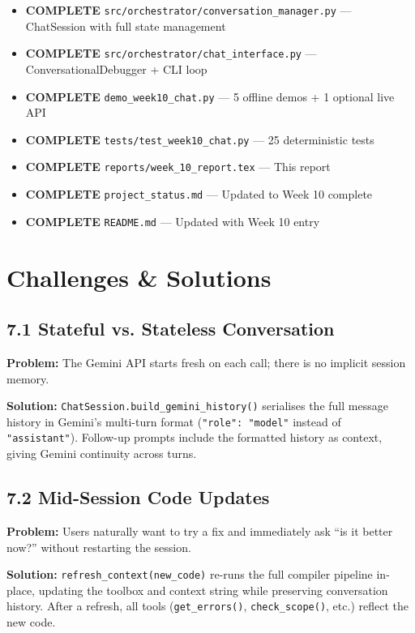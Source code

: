 \documentclass[a4paper,11pt]{article}
\newcommand{\statusgood}[1]{\colorbox{green!20}{\textbf{#1}}}
\begin{document}
\begin{itemize}[leftmargin=*]
    \item \statusgood{COMPLETE} \texttt{src/orchestrator/conversation\_manager.py} --- ChatSession with full state management
    \item \statusgood{COMPLETE} \texttt{src/orchestrator/chat\_interface.py} --- ConversationalDebugger + CLI loop
    \item \statusgood{COMPLETE} \texttt{demo\_week10\_chat.py} --- 5 offline demos + 1 optional live API
    \item \statusgood{COMPLETE} \texttt{tests/test\_week10\_chat.py} --- 25 deterministic tests
    \item \statusgood{COMPLETE} \texttt{reports/week\_10\_report.tex} --- This report
    \item \statusgood{COMPLETE} \texttt{project\_status.md} --- Updated to Week 10 complete
    \item \statusgood{COMPLETE} \texttt{README.md} --- Updated with Week 10 entry
\end{itemize}

\section{Challenges \& Solutions}

\subsection{7.1 Stateful vs. Stateless Conversation}
\textbf{Problem:} The Gemini API starts fresh on each call; there is no implicit session memory.

\textbf{Solution:} \texttt{ChatSession.build\_gemini\_history()} serialises the full message history in Gemini's multi-turn format (\texttt{"role": "model"} instead of \texttt{"assistant"}). Follow-up prompts include the formatted history as context, giving Gemini continuity across turns.

\subsection{7.2 Mid-Session Code Updates}
\textbf{Problem:} Users naturally want to try a fix and immediately ask ``is it better now?'' without restarting the session.

\textbf{Solution:} \texttt{refresh\_context(new\_code)} re-runs the full compiler pipeline in-place, updating the toolbox and context string while preserving conversation history. After a refresh, all tools (\texttt{get\_errors()}, \texttt{check\_scope()}, etc.) reflect the new code.
\end{document}
